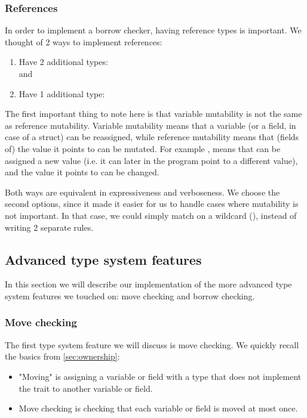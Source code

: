 \subsubsection{References}

In order to implement a borrow checker, having reference types is important. We thought of 2 ways to implement references:
\begin{enumerate}
    \item Have 2 additional types: \\ 
     and\\ 
    \item Have 1 additional type:
    \\ 
\end{enumerate}

The first important thing to note here is that variable mutability is not the same as reference mutability. Variable mutability means that a variable (or a field, in case of a struct) can be reassigned, while reference mutability means that (fields of) the value it points to can be mutated. For example , means that  can be assigned a new value (i.e. it can later in the program point to a different value), and the value it points to can be changed.

Both ways are equivalent in expressiveness and verboseness. We choose the second options, since it made it easier for us to handle cases where mutability is not important. In that case, we could simply match on a wildcard (\code{_}), instead of writing 2 separate rules.

\subsection{Advanced type system features}

In this section we will describe our implementation of the more advanced type system features we touched on: move checking and borrow checking.

\subsubsection{Move checking}

The first type system feature we will discuss is move checking. We quickly recall the basics from \autoref{sec:ownership}:
\begin{itemize}
    \item "Moving" is assigning a variable or field with a type that does not implement the  trait to another variable or field.
    \item Move checking is checking that each variable or field is moved at most once.
\end{itemize}

